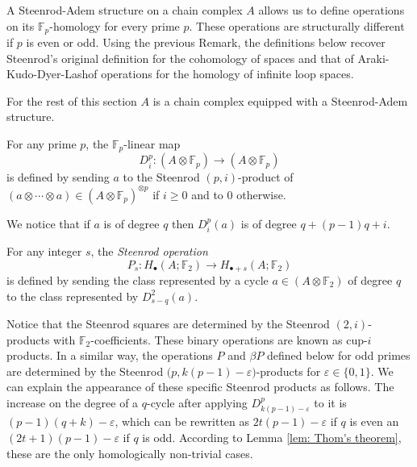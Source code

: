 A Steenrod-Adem structure on a chain complex $A$ allows us to define operations on its $\mathbb{F}_p$-homology for every prime $p$. These operations are structurally different if $p$ is even or odd. Using the previous Remark, the definitions below recover Steenrod's original definition for the cohomology of spaces and that of Araki-Kudo-Dyer-Lashof operations for the homology of infinite loop spaces.

For the rest of this section $A$ is a chain complex equipped with a Steenrod-Adem structure.

\begin{definition}
	For any prime $p$, the $\mathbb{F}_p$-linear map
	\begin{equation*}
	D^p_i : (A \otimes \mathbb{F}_p) \to (A \otimes \mathbb{F}_p)
	\end{equation*}
	is defined by sending $a$ to the Steenrod \mbox{$(p, i)$-product} of $(a \otimes \cdots \otimes a) \in (A \otimes \mathbb{F}_p)^{\otimes p}$ if $i \geq 0$ and to $0$ otherwise.
\end{definition}

We notice that if $a$ is of degree $q$ then $D^p_i(a)$ is of degree $q + (p-1)q + i$.

\begin{definition}
	For any integer $s$, the \textit{Steenrod operation}
	\begin{equation*}
	P_s : H_\bullet(A; \mathbb{F}_2) \to H_{\bullet + s}(A; \mathbb{F}_2)
	\end{equation*}
	is defined by sending the class represented by a cycle $a \in (A \otimes \mathbb{F}_2)$ of degree $q$ to the class represented by $D^2_{s-q}(a)$.
\end{definition}

Notice that the Steenrod squares are determined by the Steenrod $(2,i)$-products with $\mathbb{F}_2$-coefficients. These binary operations are known as cup-$i$ products. In a similar way, the operations $P$ and $\beta P$ defined below for odd primes are determined by the Steenrod $\big(p, k(p-1)-\varepsilon\big)$-products for $\varepsilon \in \{0,1\}$. We can explain the appearance of these specific Steenrod products as follows. The increase on the degree of a $q$-cycle after applying $D^p_{k(p-1)-\varepsilon}$ to it is $(p-1)(q+k) - \varepsilon$, which can be rewritten as $2t(p-1) - \varepsilon$ if $q$ is even an $(2t+1)(p-1) - \varepsilon$ if $q$ is odd. According to Lemma \ref{lem: Thom's theorem}, these are the only homologically non-trivial cases.


